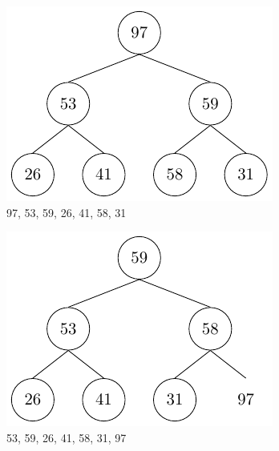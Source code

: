 \begin{center}
\begin{minipage}{0.32\textwidth}
  \begin{figure}[H]
    \centering
    \includegraphics[width=\textwidth]{Figure/HeapSort1.pdf}
    \caption*{97, 53, 59, 26, 41, 58, 31}
  \end{figure}
\end{minipage}
\begin{minipage}{0.32\textwidth}
  \begin{figure}[H]
    \centering
    \includegraphics[width=\textwidth]{Figure/HeapSort2.pdf}
    \caption*{53, 59, 26, 41, 58, 31, 97}
  \end{figure}
\end{minipage}
\begin{minipage}{0.32\textwidth}

\end{minipage}
\end{center}
